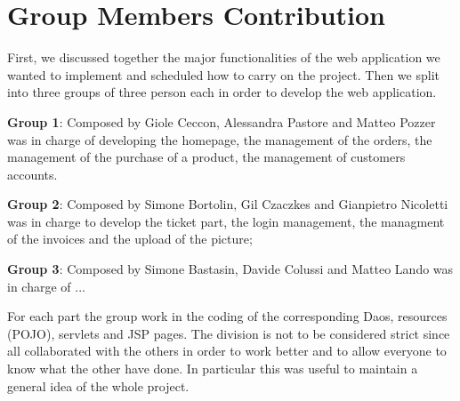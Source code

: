 \section{Group Members Contribution}

First, we discussed together the major functionalities of the web application we wanted to implement and scheduled how to carry on the project.
Then we split into three groups of three person each in order to develop the web application.


\begin{description}
	\item \textbf{Group 1}: Composed by Giole Ceccon, Alessandra Pastore and Matteo Pozzer was in charge of developing the homepage, the management of the orders, the management of the purchase of a product, the management of customers accounts.
	\item \textbf{Group 2}: Composed by Simone Bortolin, Gil Czaczkes and Gianpietro Nicoletti was in charge to develop the ticket part, the login management, the managment of the invoices and the upload of the picture;
	\item \textbf{Group 3}: Composed by Simone Bastasin, Davide Colussi and Matteo Lando was in charge of ...

For each part the group work in the coding of the corresponding Daos, resources (POJO), servlets and JSP pages.
The division is not to be considered strict since all collaborated with the others in order to work better and to allow everyone to know what the other have done. In particular this was useful to maintain a general idea of the whole project.

\end{description}